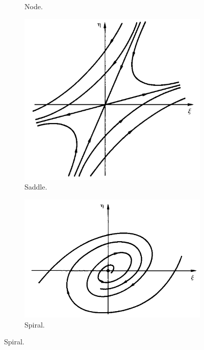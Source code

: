 \documentclass[../notes.tex]{subfiles}
\begin{document}
\begin{itemize}
\begin{figure}[h!]
\begin{subfigure}[b]{0.24\linewidth}
            \caption{Node.}
            \label{fig:flows2Da}
        \end{subfigure}
        \begin{subfigure}[b]{0.24\linewidth}
            \centering
            \includegraphics[width=0.95\linewidth]{../ExtFiles/flows2Db.png}
            \caption{Saddle.}
            \label{fig:flows2Db}
        \end{subfigure}
        \begin{subfigure}[b]{0.24\linewidth}
            \centering
            \includegraphics[width=0.95\linewidth]{../ExtFiles/flows2Dc.png}
            \caption{Spiral.}
            \label{fig:flows2Dc}
        \end{subfigure}

\end{figure}
\end{itemize}
\end{document}
